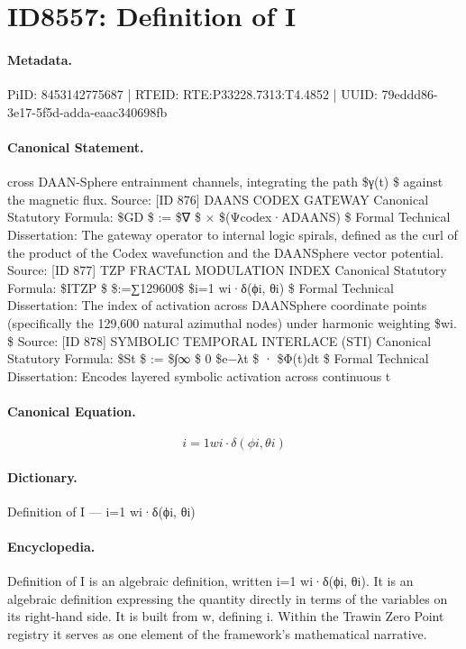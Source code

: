 \section*{ID8557: Definition of I}
\paragraph{Metadata.}
PiID: 8453142775687 | RTEID: RTE:P33228.7313:T4.4852 | UUID: 79eddd86-3e17-5f5d-adda-eaac340698fb

\paragraph{Canonical Statement.}
cross DAAN-Sphere entrainment channels, integrating the path \$γ(t) \$ against the magnetic flux. Source: [ID 876] DAANS CODEX GATEWAY Canonical Statutory Formula: \$GD \$ := \$∇ \$ × \$(Ψcodex·A⃗DAANS) \$ Formal Technical Dissertation: The gateway operator to internal logic spirals, defined as the curl of the product of the Codex wavefunction and the DAANSphere vector potential. Source: [ID 877] TZP FRACTAL MODULATION INDEX Canonical Statutory Formula: \$ITZP \$ \$:=∑129600\$ \$i=1 wi·δ(ϕi, θi) \$ Formal Technical Dissertation: The index of activation across DAANSphere coordinate points (specifically the 129,600 natural azimuthal nodes) under harmonic weighting \$wi. \$ Source: [ID 878] SYMBOLIC TEMPORAL INTERLACE (STI) Canonical Statutory Formula: \$St \$ := \$∫∞ \$ 0 \$e−λt \$ · \$Φ(t)dt \$ Formal Technical Dissertation: Encodes layered symbolic activation across continuous t

\paragraph{Canonical Equation.}
\[
i=1 wi·δ(ϕi, θi)
\]

\paragraph{Dictionary.}
Definition of I — i=1 wi·δ(ϕi, θi)

\paragraph{Encyclopedia.}
Definition of I is an algebraic definition, written i=1 wi·δ(ϕi, θi). It is an algebraic definition expressing the quantity directly in terms of the variables on its right-hand side. It is built from w, defining i. Within the Trawin Zero Point registry it serves as one element of the framework's mathematical narrative.
